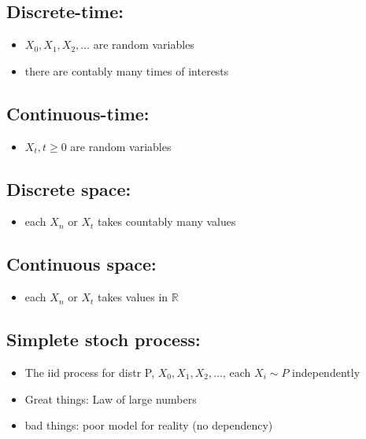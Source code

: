\documentclass{article}
\begin{document}
\subsection{Discrete-time:}
\begin{itemize}
    \item $X_0, X_1, X_2, \ldots$ are random variables
    \item there are contably many times of interests
\end{itemize}


\subsection{Continuous-time:}
\begin{itemize}
    \item $X_t, t \geq 0$ are random variables
\end{itemize}

\subsection{Discrete space:}
\begin{itemize}
    \item each $X_n$ or $X_t$ takes countably many values
\end{itemize}

\subsection{Continuous space:}
\begin{itemize}
    \item each $X_n$ or $X_t$ takes values in $\mathbb{R}$
\end{itemize}

\subsection{Simplete stoch process:}
\begin{itemize}
    \item The iid process for distr P, $X_0, X_1, X_2, \ldots$, each $X_i \sim P$ independently
    \item Great things: Law of large numbers
    \item bad things: poor model for reality (no dependency)
\end{itemize}
\end{document}
